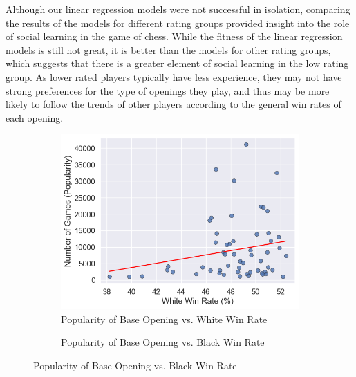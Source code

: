 \documentclass[a4paper, 11pt]{article}
\begin{document}
Although our linear regression models were not successful in isolation, comparing the results of the models for different rating groups provided insight into the role of social learning in the game of chess. While the fitness of the linear regression models is still not great, it is better than the models for other rating groups, which suggests that there is a greater element of social learning in the low rating group. As lower rated players typically have less experience, they may not have strong preferences for the type of openings they play, and thus may be more likely to follow the trends of other players according to the general win rates of each opening.

\begin{figure}[H]
    \centering
    \caption{Popularity of Base Opening vs. Win Rates (Players Rated 1200 and Below)}
    \label{fig:popularityOfBaseOpeningVsWinRatesLowRatedPlayers}
    \begin{subfigure}{0.49\textwidth}
        \centering
        \caption{Popularity of Base Opening vs. White Win Rate}
        \label{fig:popularityOfBaseOpeningVsWhiteWinRateLowRatedPlayers}
        \includegraphics[width=\textwidth]{Popularity of Base Opening vs. White Win Rate (Rated 1200-).png}
    \end{subfigure}
    \hfill
    \begin{subfigure}{0.49\textwidth}
        \centering
        \caption{Popularity of Base Opening vs. Black Win Rate}
        \label{fig:popularityOfBaseOpeningVsBlackWinRateLowRatedPlayers}

\end{subfigure}
\end{figure}
\end{document}
